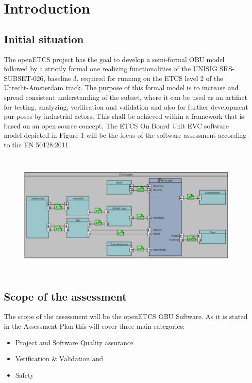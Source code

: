 \section{Introduction}
\bigskip
\subsection{Initial situation}
\bigskip
The openETCS project has the goal to develop a semi-formal OBU model followed by a strictly formal one realizing functionalities of the UNISIG SRS-SUBSET-026, baseline 3, required for running on the ETCS level 2 of the Utrecht-Amsterdam track. The purpose of this formal model is to increase and spread consistent understanding of the subset, where it can be used as an artifact for testing, analyzing, verification and validation and also for further development pur-poses by industrial actors. This shall be achieved within a framework that is based on an open source concept. The ETCS On Board Unit EVC software model depicted in Figure 1 will be the focus of the software assessment according to the EN 50128:2011.

\begin{figure}
\label{toplevelarchitecture} 
\centering
\includegraphics[width=14.552cm,height=6.35cm]{../images/toplevelarchitecture.pdf}
\end{figure}



\bigskip

\subsection{Scope of the assessment}
\bigskip
The scope of the assessment will be the openETCS OBU Software. As it is stated in the Assessment Plan this will cover three main categories:

\begin{itemize}
\item Project and Software Quality assurance 
\item Verification \& Validation and 
\item Safety 
\end{itemize}

